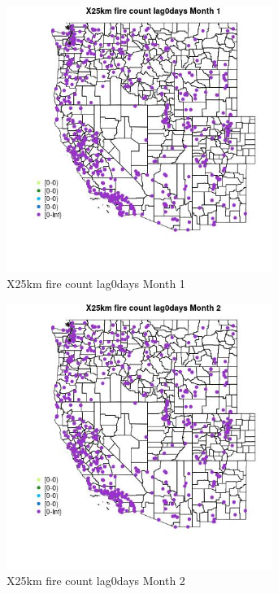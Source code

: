 \begin{figure} 
\centering  
\includegraphics[width=0.77\textwidth]{Code_Outputs/Report_ML_input_PM25_Step4_part_e_de_duplicated_aves_compiled_2019-05-14wNAs_MapObsMo1X25km_fire_count_lag0days.jpg} 
\caption{\label{fig:Report_ML_input_PM25_Step4_part_e_de_duplicated_aves_compiled_2019-05-14wNAsMapObsMo1X25km_fire_count_lag0days}X25km fire count lag0days Month 1} 
\end{figure} 
 

\begin{figure} 
\centering  
\includegraphics[width=0.77\textwidth]{Code_Outputs/Report_ML_input_PM25_Step4_part_e_de_duplicated_aves_compiled_2019-05-14wNAs_MapObsMo2X25km_fire_count_lag0days.jpg} 
\caption{\label{fig:Report_ML_input_PM25_Step4_part_e_de_duplicated_aves_compiled_2019-05-14wNAsMapObsMo2X25km_fire_count_lag0days}X25km fire count lag0days Month 2} 
\end{figure} 
 

